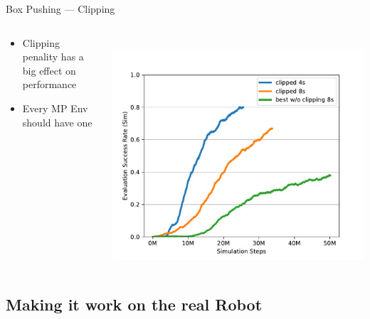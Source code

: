 \documentclass[16:9,en,navbarinfooter]{sdqbeamer}
\begin{document}
\begin{frame}{Box Pushing --- Clipping}
      
\begin{columns}       
     \begin{column}{0.4\textwidth}
        \vspace{1cm}
        \begin{itemize}
                \item Clipping penality has a big effect on performance
                \item Every MP Env should have one
        \end{itemize}
    \end{column}
    \begin{column}{0.6\textwidth}
        \vspace{.2cm} \\
        \includegraphics[width=\linewidth]{media/clipping_reward.pdf}

    \end{column}
\end{columns}       
\end{frame}

\subsection{Making it work on the real Robot}
\end{document}
